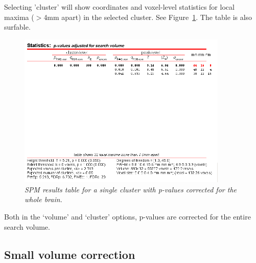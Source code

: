 Selecting 'cluster' will show coordinates and voxel-level statistics for local maxima ($>$4mm apart) in the selected cluster. See Figure~\ref{cluster}. The table is also surfable.
\begin{figure}
\begin{center}
\includegraphics[width=100mm]{pet/cluster}
\caption{\em SPM results table for a single cluster with p-values corrected for the whole brain.  \label{cluster}}
\end{center}
\end{figure}
Both in the `volume' and `cluster' options, p-values are corrected for the entire search volume.

\subsection{Small volume correction}

